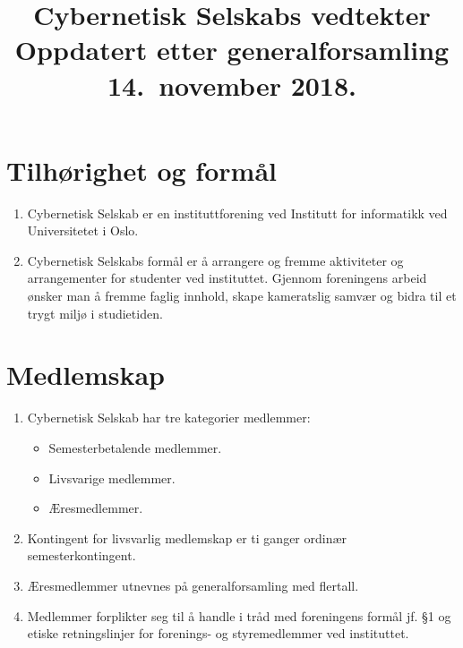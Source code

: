 \documentclass[8pt,norsk,a4paper]{article}
\title{\textbf{Cybernetisk Selskabs vedtekter} \\
	{\large Oppdatert etter generalforsamling 14.~november 2018.}}
\date{}
\author{}
\begin{document}
\maketitle{}

\section{Tilhørighet og formål}
\begin{enumerate}
	\item{Cybernetisk Selskab er en instituttforening ved Institutt for informatikk ved Universitetet i Oslo.}
	\item{Cybernetisk Selskabs formål er å arrangere og fremme aktiviteter og arrangementer for studenter ved instituttet. Gjennom foreningens arbeid ønsker man å fremme faglig innhold, skape kameratslig samvær og bidra til et trygt miljø i studietiden.}
\end{enumerate}

\section{Medlemskap}\label{sec:medlemskap}
\begin{enumerate}
	\item{Cybernetisk Selskab har tre kategorier medlemmer:}
	\begin{itemize}
		\item{Semesterbetalende medlemmer.}
		\item{Livsvarige medlemmer.}
		\item{Æresmedlemmer.}
	\end{itemize}
	\item{Kontingent for livsvarlig medlemskap er ti ganger ordinær semesterkontingent.}
	\item{Æresmedlemmer utnevnes på generalforsamling med  flertall.}
	\item{Medlemmer forplikter seg til å handle i tråd med foreningens formål jf. §1 og etiske retningslinjer for forenings- og styremedlemmer ved instituttet\footnotemark.\label{item:forpliktelser}}
\end{enumerate}
\end{document}

